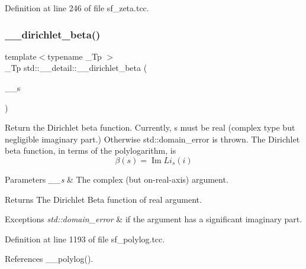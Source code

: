 Definition at line 246 of file sf\+\_\+zeta.\+tcc.

\mbox{\label{namespacestd_1_1____detail_ad0c8e975438d30cbfb5cad91f3ac6d01}} 
\subsubsection{\texorpdfstring{\+\_\+\+\_\+dirichlet\+\_\+beta()}{\_\_dirichlet\_beta()}\hspace{0.1cm}{\footnotesize\ttfamily [1/2]}}
{\footnotesize\ttfamily template$<$typename \+\_\+\+Tp $>$ \\
\+\_\+\+Tp std\+::\+\_\+\+\_\+detail\+::\+\_\+\+\_\+dirichlet\+\_\+beta (\begin{DoxyParamCaption}\item[{std\+::complex$<$ \+\_\+\+Tp $>$}]{\+\_\+\+\_\+s }\end{DoxyParamCaption})}

Return the Dirichlet beta function. Currently, s must be real (complex type but negligible imaginary part.) Otherwise std\+::domain\+\_\+error is thrown. The Dirichlet beta function, in terms of the polylogarithm, is \[ \renewcommand\Re{\operatorname{Re}} \renewcommand\Im{\operatorname{Im}} \beta(s) = \Im{Li_s(i)} \]


\begin{DoxyParams}{Parameters}
{\em \+\_\+\+\_\+s} & The complex (but on-\/real-\/axis) argument. \\
\hline
\end{DoxyParams}
\begin{DoxyReturn}{Returns}
The Dirichlet Beta function of real argument. 
\end{DoxyReturn}

\begin{DoxyExceptions}{Exceptions}
{\em std\+::domain\+\_\+error} & if the argument has a significant imaginary part. \\
\hline
\end{DoxyExceptions}


Definition at line 1193 of file sf\+\_\+polylog.\+tcc.



References \+\_\+\+\_\+polylog().

